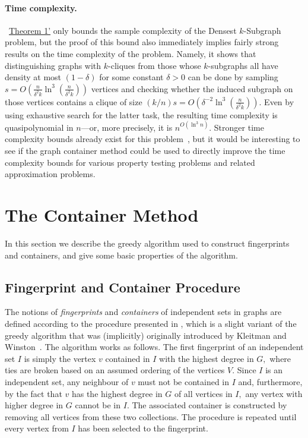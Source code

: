 \documentclass[11pt]{article}
\begin{document}
\paragraph{Time complexity.}
~\hyperlink{thm:clique-alt}{Theorem 1'} only bounds the sample complexity of the Densest $k$-Subgraph problem, but the proof of this bound also immediately implies fairly strong results on the time complexity of the problem. Namely, it shows that distinguishing graphs with $k$-cliques from those whose $k$-subgraphs all have density at most $(1-\delta)$ for some constant $\delta > 0$ can be done by sampling $s = O( \frac{n}{\delta^2k} \ln^3( \frac{n}{\delta^2 k}))$ vertices and checking whether the induced subgraph on those vertices contains a clique of size $(k/n)s = O(\delta^{-2} \ln^3( \frac{n}{\delta^2k}))$. Even by using exhaustive search for the latter task, the resulting time complexity is quasipolynomial in $n$---or, more precisely, it is $n^{O(\ln^3 n)}$. Stronger time complexity bounds already exist for this problem~\cite{FeigeSeltser97}, but it would be interesting to see if the graph container method could be used to directly improve the time complexity bounds for various property testing problems and related approximation problems.




\section{The Container Method}
\label{sect:containers}
In this section we describe the greedy algorithm used to construct fingerprints and containers, and give some basic properties of the algorithm.

\subsection{Fingerprint and Container Procedure}
The notions of \emph{fingerprints} and \emph{containers} of independent sets in graphs are defined according to the procedure presented in , which is a slight variant of the greedy algorithm that was (implicitly) originally introduced by Kleitman and Winston~\cite{kleitmanWinston1982}. The algorithm works as follows. The first fingerprint of an independent set $I$ is simply the vertex $v$ contained in $I$ with the highest degree in $G,$ where ties are broken based on an assumed ordering of the vertices $V.$ Since $I$ is an independent set, any neighbour of $v$ must not be contained in $I$ and, furthermore, by the fact that $v$ has the highest degree in $G$ of all vertices in $I,$  any vertex with higher degree in $G$ cannot be in $I.$ The associated container is constructed by removing all vertices from these two collections. The procedure is repeated until every vertex from $I$ has been selected to the fingerprint.
\end{document}
